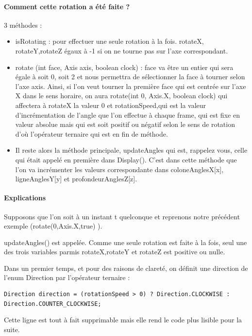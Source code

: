 \paragraph{Comment cette rotation a été faite ?}
3 méthodes :
\begin{itemize}
    \item isRotating : pour effectuer une seule rotation à la fois. rotateX, rotateY,rotateZ égaux à -1 si on ne tourne pas sur l’axe correspondant.
    \item rotate (int face, Axis axis, boolean clock) :
face va être un entier qui sera égale à soit 0, soit 2 et nous permettra de sélectionner la face à tourner selon l’axe axis. Ainsi, si l’on veut tourner la première face qui est centrée sur l’axe X dans le sens horaire, on aura rotate(int 0, Axis.X, boolean clock) qui affectera à rotateX la valeur 0 et rotationSpeed,qui est la valeur d’incrémentation de l’angle que l’on effectue à chaque frame, qui est fixe en valeur absolue mais qui est soit positif ou négatif selon le sens de rotation d’où l’opérateur ternaire qui est en fin de méthode.
    \item Il reste alors la méthode principale, updateAngles qui est, rappelez vous, celle qui était appelé en première dans Display(). C'est dans cette méthode que l'on va incrémenter les valeurs correspondante dans 
coloneAnglesX[x], ligneAnglesY[y] et profondeurAnglesZ[z].
\end{itemize}

\paragraph{Explications}
Supposons que l’on soit à un instant t quelconque et reprenons notre précédent exemple (rotate(0,Axis.X,true) ).

updateAngles() est appelée. Comme une seule rotation est faite à la fois, seul une des trois variables parmis rotateX,rotateY et rotateZ est positive ou nulle.

Dans un premier temps, et pour des raisons de clareté, on définit une direction de l’enum Direction par l’opérateur ternaire :

\begin{lstlisting}[frame=single]  % Start your code-block
        Direction direction = (rotationSpeed > 0) ? Direction.CLOCKWISE : Direction.COUNTER_CLOCKWISE;
\end{lstlisting}

Cette ligne est tout à fait supprimable mais elle rend le code plus lisible pour la suite.

